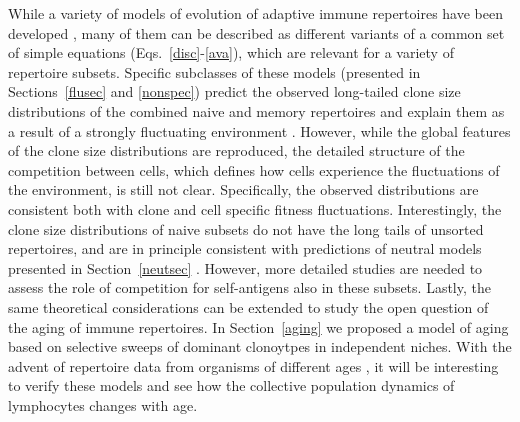\documentclass[aps,pre,twocolumn,superscriptaddress,groupedaddress]{revtex4}
\newcommand{\<}{\langle}
\renewcommand{\>}{\rangle}
\begin{document}
While a variety of models of evolution of adaptive immune repertoires have been developed \cite{DeBoer1994,DeBoer1995,DeBoer1997,DeBoer2001, Perelson2002, Lythe2016,desponds2016, Johnson2012,Mayer2015, Bains2009,Bains2013a,Hapuarachchi2013}, many of them can be described as different variants of a common set of simple equations (Eqs.~\ref{disc}-\ref{ava}), which are relevant for a variety of repertoire subsets. Specific subclasses of these models (presented in Sections~\ref{flusec} and \ref{nonspec}) predict the observed long-tailed clone size distributions of the combined naive and memory repertoires \cite{Weinstein2009,Mora2010,Zarnitsyna2013,Bolkhovskaya2014a,Menzel2014,Muraro2014,Pogorelyy2016,Mora2016e,deBoerChain} and explain them as a result of a strongly fluctuating environment \cite{desponds2016}. However, while the global features  of the clone size distributions are reproduced, the detailed structure of the competition between cells, which defines how cells experience the fluctuations of the environment, is still not clear. Specifically, the observed distributions are consistent both with clone and cell specific fitness fluctuations. Interestingly, the clone size distributions of naive subsets do not have the long tails of unsorted repertoires, and are in principle consistent with predictions of neutral models presented in Section~\ref{neutsec}  \cite{deBoerChain}. However, more detailed studies are needed to assess the role of competition for self-antigens also in these subsets. Lastly, the same theoretical considerations can be extended to study the open question of the aging of immune repertoires. In Section~\ref{aging} we proposed a model of aging based on selective sweeps of dominant clonoytpes in independent niches. 
With the advent of repertoire data from organisms of different ages \cite{Britanova2014,Britanova2016}, it will be interesting to verify these models and see how the collective population dynamics of lymphocytes changes with age.   
 
\end{document}
